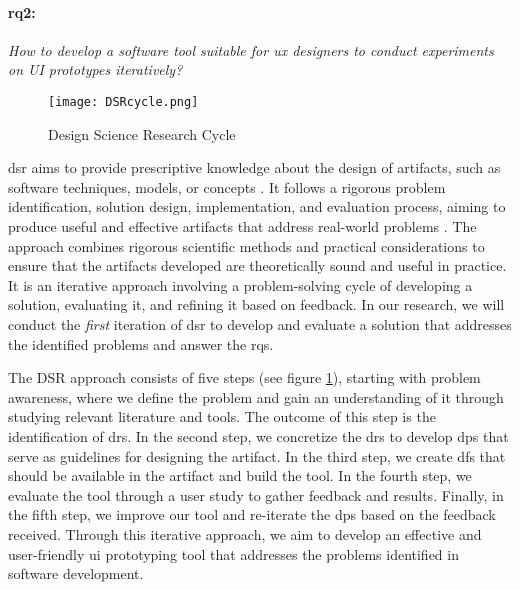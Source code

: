 \paragraph{\ac{rq}2:} \textit{How to develop a software tool suitable for \ac{ux} designers to conduct experiments on UI prototypes iteratively?}

\begin{figure}[ht]
    \centering
    \texttt{[image: DSRcycle.png]}
    \caption[Design Science Research Cycle]{Design Science Research Cycle \cite{paper:designprinciple:vk}}
    \label{intro:fig:dps}
\end{figure}

\ac{dsr} aims to provide prescriptive knowledge about the design of artifacts, such as software techniques, models, or concepts \cite{paper:designprinciple:vk}.
It follows a rigorous problem identification, solution design, implementation, and evaluation process, aiming to produce useful and effective artifacts that address real-world problems \cite{paper:designprinciple:gregor}. 
The approach combines rigorous scientific methods and practical considerations to ensure that the artifacts developed are theoretically sound and useful in practice.
It is an iterative approach involving a problem-solving cycle of developing a solution, evaluating it, and refining it based on feedback. 
In our research, we will conduct the \textit{first} iteration of \ac{dsr} to develop and evaluate a solution that addresses the identified problems and answer the \ac{rq}s.

The DSR approach consists of five steps (see figure \ref{intro:fig:dps}), starting with problem awareness, where we define the problem and gain an understanding of it through studying relevant literature and tools. 
The outcome of this step is the identification of \ac{dr}s. 
In the second step, we concretize the \ac{dr}s to develop \ac{dp}s that serve as guidelines for designing the artifact. 
In the third step, we create \ac{df}s that should be available in the artifact and build the tool.
In the fourth step, we evaluate the tool through a user study to gather feedback and results. 
Finally, in the fifth step, we improve our tool and re-iterate the \ac{dp}s based on the feedback received. 
Through this iterative approach, we aim to develop an effective and user-friendly \ac{ui} prototyping tool that addresses the problems identified in software development.


